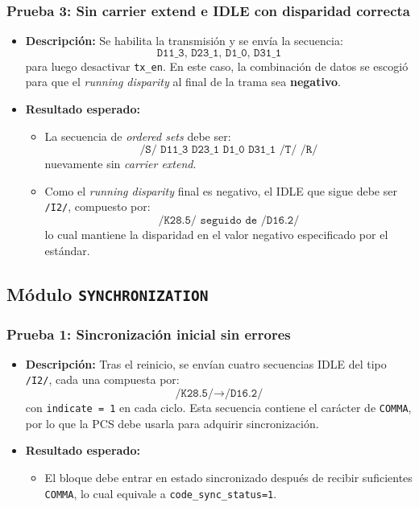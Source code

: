 \subsubsection*{Prueba 3: Sin carrier extend e IDLE con disparidad correcta}

\begin{itemize}
  \item \textbf{Descripción:} Se habilita la transmisión y se envía la secuencia:
    \[
      \texttt{D11\_3, D23\_1, D1\_0, D31\_1}
    \]
    para luego desactivar \texttt{tx\_en}. En este caso, la combinación de datos se escogió para que el \textit{running disparity} al final de la trama sea \textbf{negativo}.
  \item \textbf{Resultado esperado:}
    \begin{itemize}
      \item La secuencia de \textit{ordered sets} debe ser:
      \[
        \texttt{/S/ D11\_3 D23\_1 D1\_0 D31\_1 /T/ /R/}
      \]
      nuevamente sin \textit{carrier extend}.
      \item Como el \textit{running disparity} final es negativo, el IDLE que sigue debe ser \texttt{/I2/}, compuesto por:
        \[
          \texttt{/K28.5/ seguido de /D16.2/}
        \]
        lo cual mantiene la disparidad en el valor negativo especificado por el estándar.
    \end{itemize}
\end{itemize}


\subsection{Módulo \texttt{SYNCHRONIZATION}}

\subsubsection*{Prueba 1: Sincronización inicial sin errores}

\begin{itemize}
  \item \textbf{Descripción:}  
    Tras el reinicio, se envían cuatro secuencias IDLE del tipo \texttt{/I2/}, cada una compuesta por:
    \[
      \texttt{/K28.5/} \rightarrow \texttt{/D16.2/}
    \]
    con \texttt{indicate = 1} en cada ciclo. Esta secuencia contiene el carácter de \texttt{COMMA}, por lo que la PCS debe usarla para adquirir sincronización.
  \item \textbf{Resultado esperado:}
    \begin{itemize}
      \item El bloque debe entrar en estado sincronizado después de recibir suficientes \texttt{COMMA}, lo cual equivale a  \texttt{code\_sync\_status=1}.
    \end{itemize}
\end{itemize}

